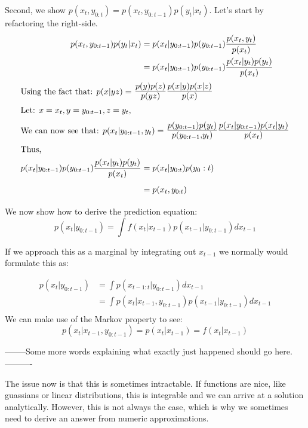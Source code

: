 \documentclass{article}
\begin{document}
Second, we show $p(x_t,y_{0:t}) = p(x_t,y_{0:t-1})p(y_t|x_t)$. Let's start by refactoring the right-side.
\begin{align*}
p(x_t,y_{0:t-1})p(y_t|x_t) &= p(x_t|y_{0:t-1})p(y_{0:t-1})\frac{p(x_t,y_t)}{p(x_t)}\\
&= p(x_t|y_{0:t-1})p(y_{0:t-1})\frac{p(x_t|y_t)p(y_t)}{p(x_t)}\\
\intertext{Using the fact that: $p(x|yz) =$ {\Large $\frac{p(y)p(z)}{p(yz)}\frac{p(x|y)p(x|z)}{p(x)}$}}
\intertext{Let: $x=x_t, y=y_{0:t-1}, z = y_t,$}
\intertext{We can now see that:  $p(x_t|y_{0:t-1},y_t) =$ {\Large $\frac{p(y_{0:t-1})p(y_t)}{p(y_{0:t-1},y_t)}\frac{p(x_t|y_{0:t-1})p(x_t|y_t)}{p(x_t)}$}}
\intertext{Thus,}
p(x_t|y_{0:t-1})p(y_{0:t-1})\frac{p(x_t|y_t)p(y_t)}{p(x_t)} &= p(x_t|y_{0:t})p(y_0:t)\\
&= p(x_t,y_{0:t})\\
\end{align*}

\noindent
We now show how to derive the prediction equation:
\begin{equation}
p(x_t|y_{0:t-1}) = \int f(x_t|x_{t-1})p(x_{t-1}|y_{0:t-1}) dx_{t-1}
\end{equation}

\noindent
If we approach this as a marginal by integrating out $x_{t-1}$ we normally would formulate this as:

\begin{equation}
\begin{split}
p(x_t|y_{0:t-1}) &= \int p(x_{t-1:t}|y_{0:t-1}) dx_{t-1}\\
&= \int p(x_t|x_{t-1},y_{0:t-1})p(x_{t-1}|y_{0:t-1}) dx_{t-1}\\
\end{split}
\end{equation}
We can make use of the Markov property to see:
\begin{equation}
p(x_t|x_{t-1},y_{0:t-1}) = p(x_t|x_{t-1}) = f(x_t|x_{t-1})
\end{equation}



--------Some more words explaining what exactly just happened should go here.----------

The issue now is that this is sometimes intractable. If functions are nice, like guassians or linear distributions, this is integrable and we can arrive at a solution analytically. However, this is not always the case, which is why we sometimes need to derive an answer from numeric approximations.
\end{document}
